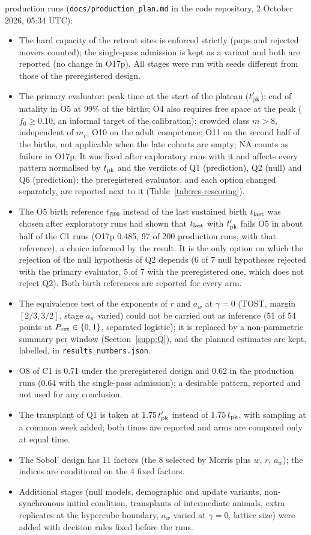 \documentclass[preprint,12pt,authoryear]{elsarticle}
\begin{document}
production runs (\texttt{docs/production\_plan.md} in the code repository, 2 October 2026, 05:34 UTC):
\begin{itemize}
\item The hard capacity of the retreat sites is enforced strictly (pups and rejected movers counted); the single-pass
  admission is kept as a variant and both are reported (no change in O17p). All stages were run with seeds
  different from those of the preregistered design.
\item The primary evaluator: peak time at the start of the plateau ($t'_{\rm pk}$); end of natality in O5 at 99\% of
  the births; O4 also requires free space at the peak ($f_0\ge0.10$, an informal target of the calibration); crowded
  class $m>8$, independent of $m_c$; O10 on the adult competence; O11 on the second half of the births, not
  applicable when the late cohorts are empty; NA counts as failure in O17p. It was fixed after exploratory runs with
  it and affects every pattern normalised by $t_{\rm pk}$ and the verdicts of Q1 (prediction), Q2 (null) and Q6
  (prediction); the preregistered evaluator, and each option changed separately, are reported next to it
  (Table~\ref{tab:res-rescoring}).
\item The O5 birth reference $t_{B99}$ instead of the last sustained birth $t_{\rm last}$ was chosen after
  exploratory runs had shown that $t_{\rm last}$ with $t'_{\rm pk}$ fails O5 in about half of the \textsf{C1} runs
  (O17p 0.485, 97 of 200 production runs, with that reference), a choice informed by the result. It is the only option on which the rejection of the null
  hypothesis of Q2 depends (6 of 7 null hypotheses rejected with the primary evaluator, 5 of 7 with the
  preregistered one, which does not reject Q2). Both birth references are reported for every arm.
\item The equivalence test of the exponents of $r$ and $a_w$ at $\gamma=0$ (TOST, margin $[2/3,3/2]$, stage $a_w$
  varied) could not be carried out as inference (51 of 54 points at $P_{\rm ext}\in\{0,1\}$, separated logistic); it
  is replaced by a non-parametric summary per window (Section~\ref{supp:Q}), and the planned estimates are kept,
  labelled, in \texttt{results\_numbers.json}.
\item O8 of \textsf{C1} is 0.71 under the preregistered design and 0.62 in the production runs (0.64 with the
  single-pass admission); a desirable pattern, reported and not used for any conclusion.
\item The transplant of Q1 is taken at $1.75\,t'_{\rm pk}$ instead of $1.75\,t_{\rm pk}$, with sampling at a common
  week added; both times are reported and arms are compared only at equal time.
\item The Sobol' design has 11 factors (the 8 selected by Morris plus $w$, $r$, $a_w$); the indices are conditional on
  the 4 fixed factors.
\item Additional stages (null models, demographic and update variants, non-synchronous initial condition, transplants
  of intermediate animals, extra replicates at the hypercube boundary, $a_w$ varied at $\gamma=0$, lattice size) were
  added with decision rules fixed before the runs.
\end{itemize}
\end{document}
